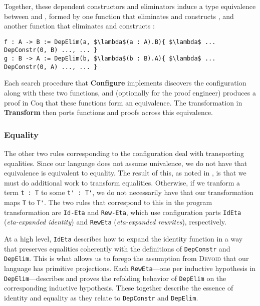 Together, these dependent constructors and eliminators induce a type equivalence between \A and \B,
formed by one function that eliminates \A and constructs \B, and another function that eliminates \B and constructs \A:

\begin{lstlisting}
f : A -> B := DepElim(a, $\lambda$(a : A).B){ $\lambda$ ... DepConstr(0, B) ..., ... }
g : B -> A := DepElim(b, $\lambda$(b : B).A){ $\lambda$ ... DepConstr(0, A) ..., ... }
\end{lstlisting}
Each search procedure that \textbf{Configure} implements discovers the configuration
along with these two functions, and (optionally for the proof engineer) produces a proof in Coq that these functions form an equivalence.
The transformation in \textbf{Transform} then ports functions and proofs across this equivalence.

\subsubsection{Equality}
\label{sec:equality}

The other two rules corresponding to the configuration deal with transporting equalities.
Since our language does not assume univalence, we do not have that equivalence is equivalent to equality.
The result of this, as noted in \citet{tabareau2019marriage},
is that we must do additional work to transform equalities.
Otherwise, if we tranform a term \lstinline{t : T} to some \lstinline{t' : T'}, we do not necessarily
have that our transformation maps \lstinline{T} to \lstinline{T'}.
The two rules that correspond to this in the program transformation are \lstinline{Id-Eta} and \lstinline{Rew-Eta},
which use configuration parts \lstinline{IdEta} (\textit{eta-expanded identity}) and \lstinline{RewEta} (\textit{eta-expanded rewrites}), respectively.

At a high level, \lstinline{IdEta} describes how to expand the identity function in a way that preserves equalities
coherently with the definitions of \lstinline{DepConstr} and \lstinline{DepElim}.
This is what allows us to forego the assumption from \textsc{Devoid} that our language has primitive projections.
Each \lstinline{RewEta}---one per inductive hypothesis in \lstinline{DepElim}---describes and proves the refolding behavior
of \lstinline{DepElim} on the corresponding inductive hypothesis.
These together describe the essence of identity and equality as they relate to \lstinline{DepConstr}
and \lstinline{DepElim}.

